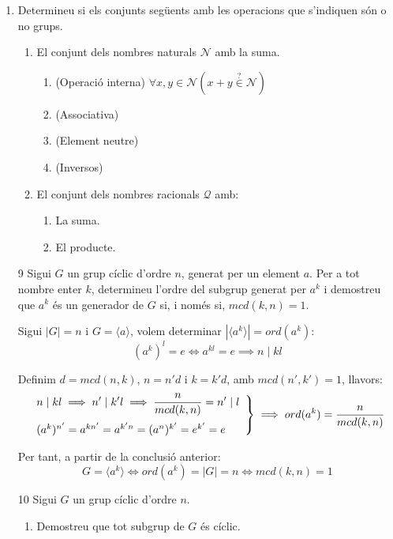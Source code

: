 \documentclass[a4paper, 11pt]{article}
\begin{document}
\begin{enumerate}
	\item Determineu si els conjunts següents amb les operacions que s'indiquen són o no grups.
	\begin{enumerate}
		\item El conjunt dels nombres naturals $\mathcal{N}$ amb la suma.
		
			\begin{enumerate}
				\item (Operació interna) $\forall x,y \in \mathcal{N} (x + y \overset{?}{\in} \mathcal{N})$
				

				\item (Associativa) 
				\item (Element neutre) 
				\item (Inversos) 
			\end{enumerate}

		\item El conjunt dels nombres racionals $\mathcal{Q}$ amb:
		\begin{enumerate}
			\item La suma.
			\item El producte.
		\end{enumerate}
	\end{enumerate}

	\item[9] Sigui $G$ un grup cíclic d'ordre $n$, generat per un element $a$. Per a tot nombre enter $k$, determineu l'ordre del subgrup generat per $a^k$ i demostreu que $a^k$ és un generador de $G$ si, i només si, $mcd(k,n) = 1$.
	
		Sigui $|G| = n$ i $G = \langle a \rangle$, volem determinar $|\langle a^k \rangle| = ord (a^k)$:
		\[(a^k)^l = e \iff a^{kl} = e \implies n \mid kl\]
	
		Definim $d = mcd (n, k)$, $n = n' d$ i $k = k' d$, amb $mcd (n', k') = 1$, llavors:
		\[\left. \begin{array}{l}
			\displaystyle n \mid kl \implies n' \mid k'l \implies \frac{n}{mcd (k, n)} = n' \mid l \medskip \\
			(a^k)^{n'} = a^{kn'}= a^{k'n} = (a^n)^{k'} = e^{k'} = e
		\end{array} \right\} \implies ord (a^k) = \frac{n}{mcd (k, n)}\]

		Per tant, a partir de la conclusió anterior:
		\[G = \langle a^k \rangle \iff ord (a^k) = |G| = n \iff mcd(k, n) = 1\]

	\item[10] Sigui $G$ un grup cíclic d'ordre $n$.
	\begin{enumerate}
		\item Demostreu que tot subgrup de $G$ és cíclic.


\end{enumerate}
\end{enumerate}
\end{document}
